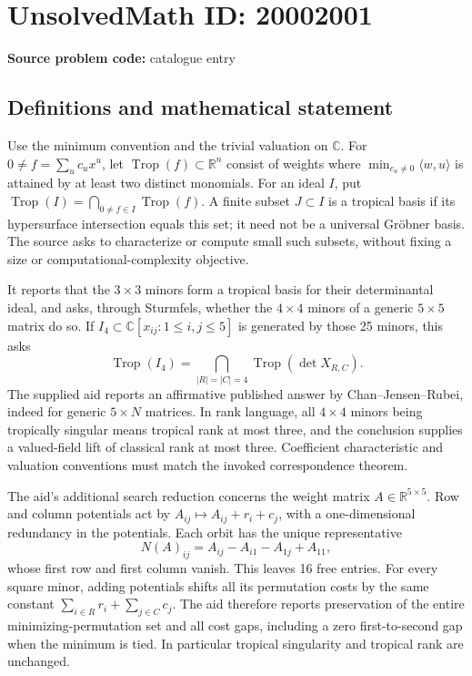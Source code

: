 \documentclass[11pt]{article}
\newcommand{\R}{\mathbb{R}}
\newcommand{\C}{\mathbb{C}}
\begin{document}
\section*{UnsolvedMath ID: 20002001}
\textbf{Source problem code:} catalogue entry
\subsection{Definitions and mathematical statement}
Use the minimum convention and the trivial valuation on \(\C\). For \(0\ne f=\sum_u c_ux^u\), let \(\operatorname{Trop}(f)\subset\R^n\) consist of weights where \(\min_{c_u\ne0}\langle w,u\rangle\) is attained by at least two distinct monomials. For an ideal \(I\), put \(\operatorname{Trop}(I)=\bigcap_{0\ne f\in I}\operatorname{Trop}(f)\). A finite subset \(J\subset I\) is a tropical basis if its hypersurface intersection equals this set; it need not be a universal Gr\"obner basis. The source asks to characterize or compute small such subsets, without fixing a size or computational-complexity objective.

It reports that the \(3\times3\) minors form a tropical basis for their determinantal ideal, and asks, through Sturmfels, whether the \(4\times4\) minors of a generic \(5\times5\) matrix do so. If \(I_4\subset\C[x_{ij}:1\leq i,j\leq5]\) is generated by those 25 minors, this asks
\[
\operatorname{Trop}(I_4)=\bigcap_{|R|=|C|=4}\operatorname{Trop}(\det X_{R,C}).
\]
The supplied aid reports an affirmative published answer by Chan--Jensen--Rubei, indeed for generic \(5\times N\) matrices. In rank language, all \(4\times4\) minors being tropically singular means tropical rank at most three, and the conclusion supplies a valued-field lift of classical rank at most three. Coefficient characteristic and valuation conventions must match the invoked correspondence theorem.

The aid's additional search reduction concerns the weight matrix \(A\in\R^{5\times5}\). Row and column potentials act by \(A_{ij}\mapsto A_{ij}+r_i+c_j\), with a one-dimensional redundancy in the potentials. Each orbit has the unique representative
\[
N(A)_{ij}=A_{ij}-A_{i1}-A_{1j}+A_{11},
\]
whose first row and first column vanish. This leaves 16 free entries. For every square minor, adding potentials shifts all its permutation costs by the same constant \(\sum_{i\in R}r_i+\sum_{j\in C}c_j\). The aid therefore reports preservation of the entire minimizing-permutation set and all cost gaps, including a zero first-to-second gap when the minimum is tied. In particular tropical singularity and tropical rank are unchanged.
\end{document}
